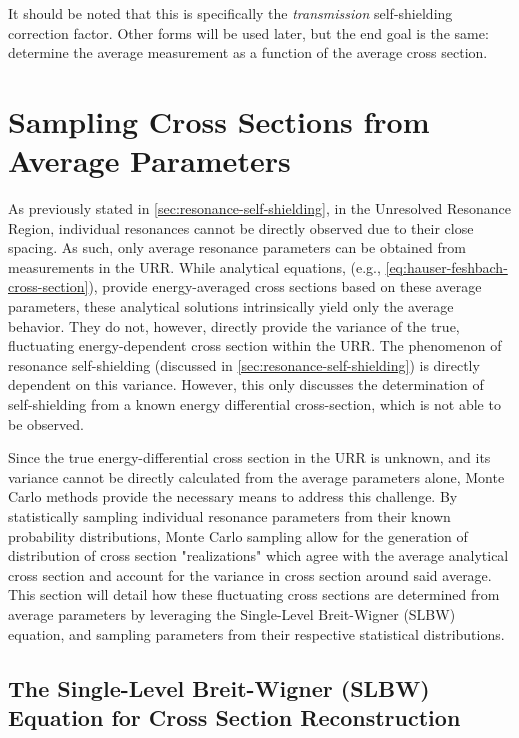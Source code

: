 It should be noted that this is specifically the \textit{transmission} self-shielding correction factor. Other forms will be used later, but the end goal is the same: determine the average measurement as a function of the average cross section.

\section{Sampling Cross Sections from Average Parameters}
\label{sec:mc-sampling-from-average-parameters}

As previously stated in \autoref{sec:resonance-self-shielding}, in the Unresolved Resonance Region, individual resonances cannot be directly observed due to their close spacing. As such, only average resonance parameters can be obtained from measurements in the URR. While analytical equations, (e.g., \autoref{eq:hauser-feshbach-cross-section}), provide energy-averaged cross sections based on these average parameters, these analytical solutions intrinsically yield only the average behavior. They do not, however, directly provide the variance of the true, fluctuating energy-dependent cross section within the URR. The phenomenon of resonance self-shielding (discussed in \autoref{sec:resonance-self-shielding}) is directly dependent on this variance. However, this only discusses the determination of self-shielding from a known energy differential cross-section, which is not able to be observed.

Since the true energy-differential cross section in the URR is unknown, and its variance cannot be directly calculated from the average parameters alone, Monte Carlo methods provide the necessary means to address this challenge. By statistically sampling individual resonance parameters from their known probability distributions, Monte Carlo sampling allow for the generation of distribution of cross section "realizations" which agree with the average analytical cross section and account for the variance in cross section around said average. This section will detail how these fluctuating cross sections are determined from average parameters by leveraging the Single-Level Breit-Wigner (SLBW) equation, and sampling parameters from their respective statistical distributions.

\subsection{The Single-Level Breit-Wigner (SLBW) Equation for Cross Section Reconstruction}
\label{sec:slbw-for-sampling}


